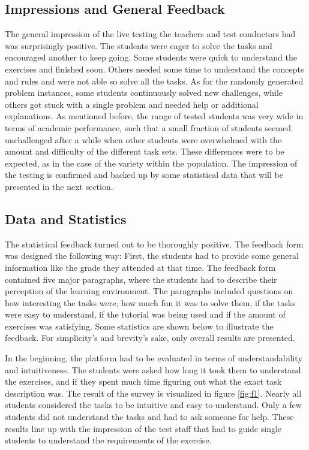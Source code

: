 \subsection{Impressions and General Feedback}
The general impression of the live testing the teachers and test conductors had was surprisingly positive. The students were eager to solve the tasks and encouraged another to keep going. Some students were quick to understand the exercises and finished soon. Others needed some time to understand the concepts and rules and were not able so solve all the tasks. As for the randomly generated problem instances, some students continuously solved new challenges, while others got stuck with a single problem and needed help or additional explanations. As mentioned before, the range of tested students was very wide in terms of academic performance, such that a small fraction of students seemed unchallenged after a while when other students were overwhelmed with the amount and difficulty of the different task sets. These differences were to be expected, as in the case of the variety within the population. The impression of the testing is confirmed and backed up by some statistical data that will be presented in the next section.

\subsection{Data and Statistics}

The statistical feedback turned out to be thoroughly positive. The feedback form was designed the following way: First, the students had to provide some general information like the grade they attended at that time. The feedback form contained five major paragraphs, where the students had to describe their perception of the learning environment. The paragraphs included questions on how interesting the tasks were, how much fun it was to solve them, if the tasks were easy to understand, if the tutorial was being used and if the amount of exercises was satisfying. Some statistics are shown below to illustrate the feedback. For simplicity's and brevity's sake, only overall results are presented.

In the beginning, the platform had to be evaluated in terms of understandability and intuitiveness. The students were asked how long it took them to understand the exercises, and if they spent much time figuring out what the exact task description was. The result of the survey is visualized in figure \ref{fig:f1}.
Nearly all students considered the tasks to be intuitive and easy to understand. Only a few students did not understand the tasks and had to ask someone for help. These results line up with the impression of the test staff that had to guide single students to understand the requirements of the exercise.



